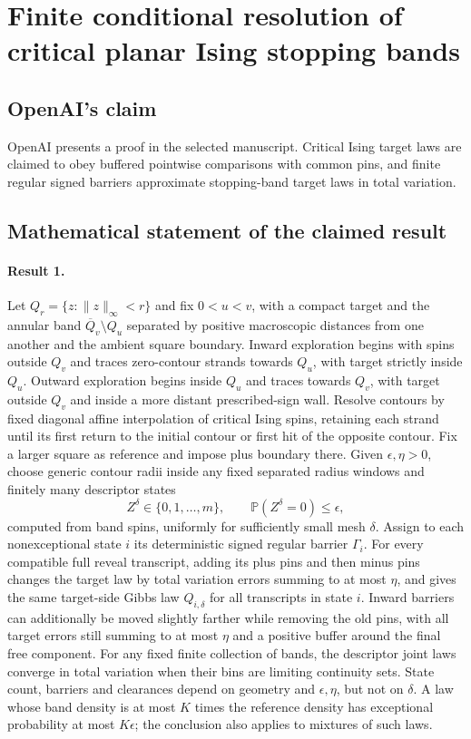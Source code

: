 \documentclass[11pt]{article}
\begin{document}
\section*{Finite conditional resolution of critical planar Ising stopping bands}

\subsection{OpenAI's claim}
OpenAI presents a proof in the selected manuscript. Critical Ising target laws are claimed to obey buffered pointwise comparisons with common pins, and finite regular signed barriers approximate stopping-band target laws in total variation.

\subsection{Mathematical statement of the claimed result}
\paragraph{Result 1.} Let $Q_r=\{z:\|z\|_\infty<r\}$ and fix $0<u<v$, with a compact target and the annular band $\overline Q_v\setminus Q_u$ separated by positive macroscopic distances from one another and the ambient square boundary. Inward exploration begins with spins outside $Q_v$ and traces zero-contour strands towards $Q_u$, with target strictly inside $Q_u$. Outward exploration begins inside $Q_u$ and traces towards $Q_v$, with target outside $Q_v$ and inside a more distant prescribed-sign wall. Resolve contours by fixed diagonal affine interpolation of critical Ising spins, retaining each strand until its first return to the initial contour or first hit of the opposite contour. Fix a larger square as reference and impose plus boundary there. Given $\epsilon,\eta>0$, choose generic contour radii inside any fixed separated radius windows and finitely many descriptor states
\[
 Z^\delta\in\{0,1,\ldots,m\},\qquad \mathbb P(Z^\delta=0)\le\epsilon,
\]
computed from band spins, uniformly for sufficiently small mesh $\delta$. Assign to each nonexceptional state $i$ its deterministic signed regular barrier $\Gamma_i$. For every compatible full reveal transcript, adding its plus pins and then minus pins changes the target law by total variation errors summing to at most $\eta$, and gives the same target-side Gibbs law $Q_{i,\delta}$ for all transcripts in state $i$. Inward barriers can additionally be moved slightly farther while removing the old pins, with all target errors still summing to at most $\eta$ and a positive buffer around the final free component. For any fixed finite collection of bands, the descriptor joint laws converge in total variation when their bins are limiting continuity sets. State count, barriers and clearances depend on geometry and $\epsilon,\eta$, but not on $\delta$. A law whose band density is at most $K$ times the reference density has exceptional probability at most $K\epsilon$; the conclusion also applies to mixtures of such laws.
\end{document}
